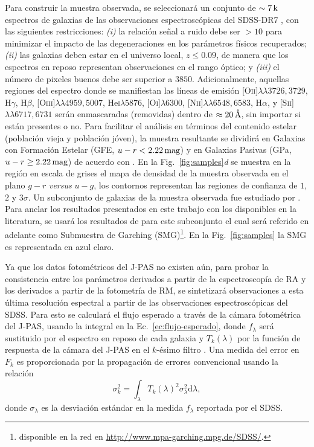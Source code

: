Para construir la muestra observada, se seleccionará un conjunto de $\sim\unit[7]{k}$ espectros de
galaxias de las observaciones espectroscópicas del SDSS-DR7 \citep{Abazajian2009}, con las
siguientes restricciones: \textit{(i)} la relación señal a ruido debe ser $>10$ para minimizar el
impacto de las degeneraciones en los parámetros físicos recuperados; \textit{(ii)} las galaxias
deben estar en el universo local, $z\leq0.09$, de manera que los espectros en reposo representan
observaciones en el rango óptico; y \textit{(iii)} el número de pixeles buenos debe ser superior a
$3850$. Adicionalmente, aquellas regiones del espectro donde se manifiestan las líneas de emisión
[O\textsc{ii}]$\lambda\lambda3726,3729$, H$\gamma$, H$\beta$,
[O\textsc{iii}]$\lambda\lambda4959,5007$, He\textsc{i}$\lambda5876$, [O\textsc{i}]$\lambda6300$,
[N\textsc{ii}]$\lambda\lambda6548,6583$, H$\alpha$, y [S\textsc{ii}]$\lambda\lambda6717,6731$ serán
enmascaradas (removidas) dentro de $\approx\unit[20]{\AA}$, sin importar si están presentes o no.
Para facilitar el análisis en términos del contenido estelar (población vieja y población jóven), la
muestra resultante se dividirá en Galaxias con Formación Estelar (GFE, $u-r<\unit[2.22]{mag}$) y en
Galaxias Pasivas (GPa, $u-r\geq\unit[2.22]{mag}$) de acuerdo con \citet{Strateva2001}. En la
Fig.~\ref{fig:samples}\textit{d} se muestra en la región en escala de grises el mapa de densidad de
la muestra observada en el plano $g-r$ \emph{versus} $u-g$, los contornos representan las regiones
de confianza de $1$, $2$ y $3\sigma$. Un subconjunto de galaxias de la muestra observada fue
estudiado por \citet{Gallazzi2005}. Para anclar los resultados presentados en este trabajo con los
disponibles en la literatura, se usará los resultados de \citet{Gallazzi2005} para este subconjunto
el cual será referido en adelante como Submuestra de Garching (SMG)\footnote{disponible en la red en
\url{http://www.mpa-garching.mpg.de/SDSS/}.}. En la Fig.~\ref{fig:samples} la SMG es representada en
azul claro.

Ya que los datos fotométricos del J-PAS no existen aún, para probar la consistencia entre los
parámetros derivados a partir de la espectroscopía de RA y los derivados a partir de la fotometría
de RM, se sintetizará observaciones a esta última resolución espectral a partir de las observaciones
espectroscópicas del SDSS. Para esto se calculará el flujo esperado a través de la cámara
fotométrica del J-PAS,  usando la integral en la Ec.~\eqref{ec:flujo-esperado}, donde $f_\lambda$
será sustituido por el espectro en reposo de cada galaxia y $T_k(\lambda)$ por la función de
respuesta de la cámara del J-PAS en el $k$-ésimo filtro \citep{Marin-Franch2015}. Una medida del
error en $F_k$ es proporcionada por la propagación de errores convencional
\citep[\eg,][]{Bevington2003} usando la relación
%
\begin{equation}\label{ec:error-prop}
\sigma_k^2 = \int_\lambda T_k(\lambda)^2\sigma_\lambda^2\text{d}\lambda,
\end{equation}
%
donde $\sigma_\lambda$ es la desviación estándar en la medida $f_\lambda$ reportada por el
SDSS.

